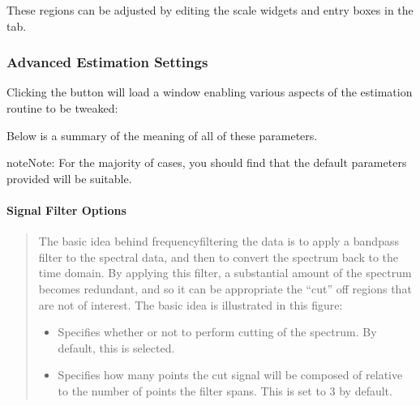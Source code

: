 \documentclass[letterpaper,10pt,english]{sphinxmanual}
\begin{document}
\sphinxAtStartPar
These regions can be adjusted by editing the scale widgets and entry boxes
in the  tab.


\subsubsection{Advanced Estimation Settings}
\label{\detokenize{gui/usage/setup:advanced-estimation-settings}}
\sphinxAtStartPar
Clicking the  button will load a window enabling various
aspects of the estimation routine to be tweaked:


\sphinxAtStartPar
Below is a summary of the meaning of all of these parameters.

\begin{sphinxadmonition}{note}{Note:}
\sphinxAtStartPar
For the majority of cases, you should find that the default parameters
provided will be suitable.
\end{sphinxadmonition}


\paragraph{Signal Filter Options}
\label{\detokenize{gui/usage/setup:signal-filter-options}}\begin{quote}

\sphinxAtStartPar
The basic idea behind frequency\sphinxhyphen{}filtering the data is to apply a band\sphinxhyphen{}pass
filter to the spectral data, and then to convert the spectrum back to the
time domain. By applying this filter, a substantial amount of the spectrum
becomes redundant, and so it can be appropriate the “cut” off regions that are
not of interest. The basic idea is illustrated in this figure:

\begin{itemize}
\item {} 
\sphinxAtStartPar
{} \sphinxhyphen{} Specifies whether or not to perform cutting of the spectrum.
By default, this is selected.

\item {} 
\sphinxAtStartPar
{} \sphinxhyphen{} Specifies how many points the cut signal
will be composed of relative to the number of points the filter spans. This
is set to 3 by default.

\end{itemize}
\end{quote}
\end{document}
